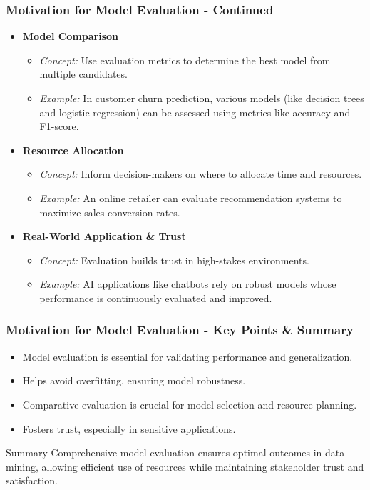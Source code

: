 \documentclass[aspectratio=169]{beamer}
\begin{document}
\begin{frame}[fragile]
    \frametitle{Motivation for Model Evaluation - Continued}
    \begin{itemize}
        \item \textbf{Model Comparison}
        \begin{itemize}
            \item \textit{Concept:} Use evaluation metrics to determine the best model from multiple candidates.
            \item \textit{Example:} In customer churn prediction, various models (like decision trees and logistic regression) can be assessed using metrics like accuracy and F1-score.
        \end{itemize}
        
        \item \textbf{Resource Allocation}
        \begin{itemize}
            \item \textit{Concept:} Inform decision-makers on where to allocate time and resources.
            \item \textit{Example:} An online retailer can evaluate recommendation systems to maximize sales conversion rates.
        \end{itemize}
        
        \item \textbf{Real-World Application \& Trust}
        \begin{itemize}
            \item \textit{Concept:} Evaluation builds trust in high-stakes environments.
            \item \textit{Example:} AI applications like chatbots rely on robust models whose performance is continuously evaluated and improved.
        \end{itemize}
    \end{itemize}
\end{frame}

\begin{frame}[fragile]
    \frametitle{Motivation for Model Evaluation - Key Points \& Summary}
    \begin{itemize}
        \item Model evaluation is essential for validating performance and generalization.
        \item Helps avoid overfitting, ensuring model robustness.
        \item Comparative evaluation is crucial for model selection and resource planning.
        \item Fosters trust, especially in sensitive applications.
    \end{itemize}
    
    \begin{block}{Summary}
        Comprehensive model evaluation ensures optimal outcomes in data mining, allowing efficient use of resources while maintaining stakeholder trust and satisfaction.
    \end{block}
\end{frame}
\end{document}

